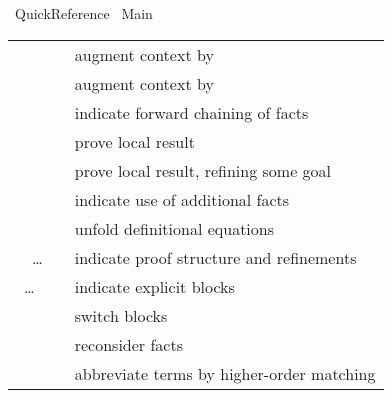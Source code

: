 %
\begin{isabellebody}%
\def\isabellecontext{Quick{\isacharunderscore}Reference}%
%
\isadelimtheory
\isanewline
\isanewline
%
\endisadelimtheory
%
\isatagtheory
{}\isamarkupfalse%
\ Quick{\isacharunderscore}Reference\isanewline
{}\ Main\isanewline
{}%
\endisatagtheory
{\isafoldtheory}%
%
\isadelimtheory
%
\endisadelimtheory
%
\isamarkuptrue%
%
\isamarkuptrue%
%
\isamarkuptrue%
%
\begin{isamarkuptext}%
\begin{tabular}{ll}
    \mbox{\isa{\isacommand{fix}}}~\isa{x} & augment context by \isa{{\isasymAnd}x{\isachardot}\ {\isasymbox}} \\
    \mbox{\isa{\isacommand{assume}}}~\isa{a{\isacharcolon}\ {\isasymphi}} & augment context by \isa{{\isasymphi}\ {\isasymLongrightarrow}\ {\isasymbox}} \\
    \mbox{\isa{\isacommand{then}}} & indicate forward chaining of facts \\
    \mbox{\isa{\isacommand{have}}}~\isa{a{\isacharcolon}\ {\isasymphi}} & prove local result \\
    \mbox{\isa{\isacommand{show}}}~\isa{a{\isacharcolon}\ {\isasymphi}} & prove local result, refining some goal \\
    \mbox{\isa{\isacommand{using}}}~\isa{a} & indicate use of additional facts \\
    \mbox{\isa{\isacommand{unfolding}}}~\isa{a} & unfold definitional equations \\
    \mbox{\isa{\isacommand{proof}}}~\isa{m\isactrlsub {\isadigit{1}}}~\dots~\mbox{\isa{\isacommand{qed}}}~\isa{m\isactrlsub {\isadigit{2}}} & indicate proof structure and refinements \\
    \mbox{\isa{\isacommand{{\isacharbraceleft}}}}~\dots~\mbox{\isa{\isacommand{{\isacharbraceright}}}} & indicate explicit blocks \\
    \mbox{\isa{\isacommand{next}}} & switch blocks \\
    \mbox{\isa{\isacommand{note}}}~\isa{a\ {\isacharequal}\ b} & reconsider facts \\
    \mbox{\isa{\isacommand{let}}}~\isa{p\ {\isacharequal}\ t} & abbreviate terms by higher-order matching \\
  \end{tabular}


\end{isamarkuptext}
\end{isabellebody}
